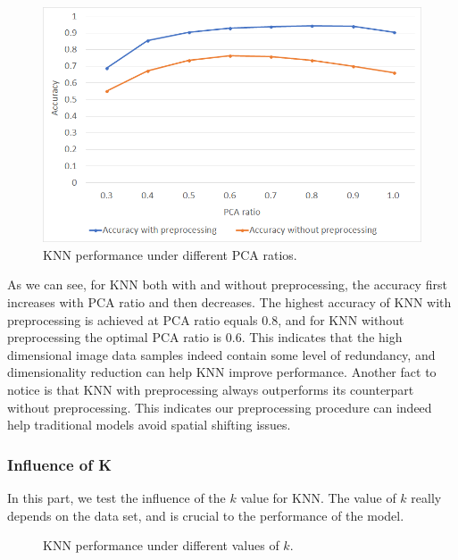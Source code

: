 \documentclass{article}
\begin{document}
\begin{figure}[!htb]
	\centering\includegraphics[width=.8\textwidth]{fig//KNN_PCA}
	\caption{KNN performance under different PCA ratios.}\label{fig:KNN_PCA}
\end{figure}

As we can see, for KNN both with and without preprocessing, the accuracy first increases with PCA ratio and then decreases. The highest accuracy of KNN with preprocessing is achieved at PCA ratio equals 0.8, and for KNN without preprocessing the optimal PCA ratio is 0.6. This indicates that the high dimensional image data samples indeed contain some level of redundancy, and dimensionality reduction can help KNN improve performance. Another fact to notice is that KNN with preprocessing always outperforms its counterpart without preprocessing. This indicates our preprocessing procedure can indeed help traditional models avoid spatial shifting issues.

\subsubsection{Influence of K}
In this part, we test the influence of the $k$ value for KNN. The value of $k$ really depends on the data set, and is crucial to the performance of the model.

\begin{figure}[!htb]
	\centering
	\hspace{.2in}
	\caption{KNN performance under different values of $k$.}\label{fig:KNN}
\end{figure}
\end{document}
